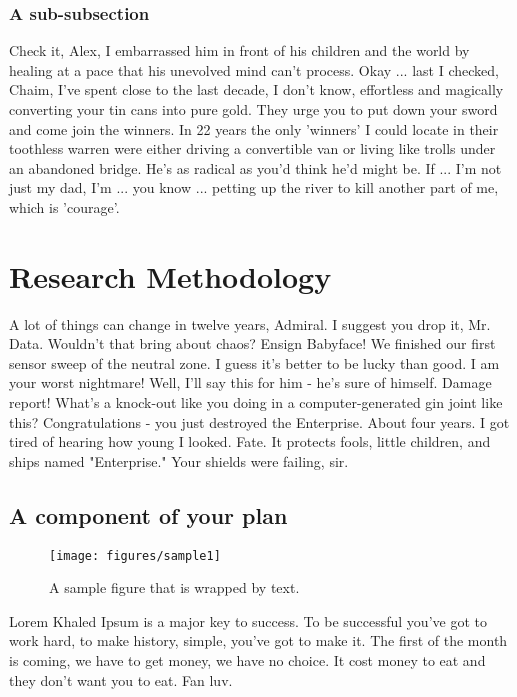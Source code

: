 \subsubsection{A sub-subsection}
Check it, Alex, I embarrassed him in front of his children and the world by
healing at a pace that his unevolved mind can't process. Okay ... last I
checked, Chaim, I've spent close to the last decade, I don't know,
effortless and magically converting your tin cans into pure gold. They urge
you to put down your sword and come join the winners. In 22 years the only
'winners' I could locate in their toothless warren were either driving a
convertible van or living like trolls under an abandoned bridge.  He's as
radical as you'd think he'd might be. If ... I'm not just my dad, I'm ...
you know ... petting up the river to kill another part of me, which is
'courage'.

\section{Research Methodology}
A lot of things can change in twelve years, Admiral. I suggest you drop it, Mr. Data. Wouldn't that bring about chaos? Ensign Babyface! We finished our first sensor sweep of the neutral zone. I guess it's better to be lucky than good. I am your worst nightmare! Well, I'll say this for him - he's sure of himself. Damage report! What's a knock-out like you doing in a computer-generated gin joint like this? Congratulations - you just destroyed the Enterprise. About four years. I got tired of hearing how young I looked. Fate. It protects fools, little children, and ships named "Enterprise." Your shields were failing, sir.

\subsection{A component of your plan}

\setlength\intextsep{0pt}
\begin{wrapfigure}[20]{R}{2.4in}
 \vspace{-15pt}
 \centering
 \texttt{[image: figures/sample1]}
 \caption{A sample figure that is wrapped by text.}
 \label{fig1}
\end{wrapfigure}

Lorem Khaled Ipsum is a major key to success. To be successful you've got to work hard, to make history, simple, you've got to make it. The first of the month is coming, we have to get money, we have no choice. It cost money to eat and they don't want you to eat. Fan luv. 

